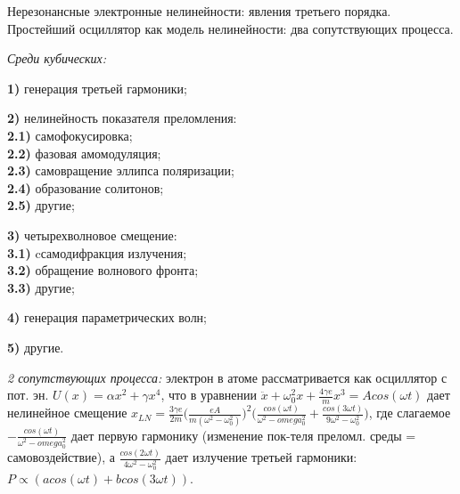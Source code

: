 
\begin{leftrules}
Нерезонансные электронные нелинейности: явления третьего порядка. Простейший осциллятор как модель нелинейности: два сопутствующих процесса.
\end{leftrules}



\textit{Среди кубических:}\\
    \par \textbf{1)} генерация третьей гармоники; \\
    \par \textbf{2)} нелинейность показателя преломления: \\
     \textbf{2.1)} самофокусировка; \\
     \textbf{2.2)} фазовая амомодуляция; \\
     \textbf{2.3)} самовращение эллипса поляризации; \\
     \textbf{2.4)} образование солитонов; \\
     \textbf{2.5)} другие; \\
    \par \textbf{3)} четырехволновое смещение: \\
     \textbf{3.1)} cсамодифракция излучения; \\
     \textbf{3.2)} обращение волнового фронта; \\
     \textbf{3.3)} другие; \\
    \par \textbf{4)} генерация параметрических волн; \\
    \par \textbf{5)} другие.


\textit{2 сопутствующих процесса:} электрон в атоме рассматривается как осциллятор с пот. эн. $U(x)=\alpha x^{2} + \gamma x^{4}$, что в уравнении $\ddot{x} + \omega_{0}^{2} x + \frac{4\gamma e}{m} x^{3} = Acos(\omega t)$ дает нелинейное смещение $x_{LN} = \frac{3\gamma e}{2m} \Big( \frac{eA}{m(\omega^{2}-\omega_{0}^{2})} \Big)^{2} \Big( \frac{cos(\omega t)}{\omega^{2}-omega_{0}^{2}} + \frac{cos(3\omega t)}{9\omega^{2}-\omega_{0}^{2}} \Big)$, где слагаемое $-\frac{cos(\omega t)}{\omega^{2}-omega_{0}^{2}}$ дает первую гармонику (изменение пок-теля преломл. среды = самовоздействие), а $\frac{cos(2\omega t)}{4\omega^{2}-\omega_{0}^{2}}$ дает излучение третьей гармоники: $P \propto (acos(\omega t)+bcos(3\omega t))$.
